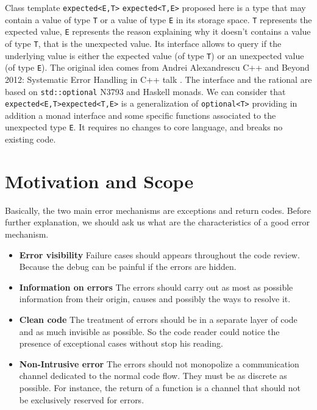 \documentclass[a4paper,10pt]{article}
\newcommand{\cpp}[1]{\lstinline{#1}}
\newcommand{\suppress}[1]{\colorbox{suppress_color}{#1}}
\newcommand{\update}[1]{\colorbox{update_color}{#1}}
\begin{document}
Class template \suppress{\cpp{expected<E,T>}} \update{\cpp{expected<T,E>}} proposed here is a type that may contain a value of type \cpp{T} or a value of type \cpp{E} in its storage space. \cpp{T} represents the expected value, \cpp{E} represents the reason explaining why it doesn't contains a value of type \cpp{T}, that is the unexpected value. Its interface allows to query if the underlying value is either the expected value (of type \cpp{T}) or an unexpected value (of type \cpp{E}). The original idea comes from Andrei Alexandrescu C++ and Beyond 2012: Systematic Error Handling in C++ talk \cite{AlexandrescuExpected}. The interface and the rational are based on \cpp{std::optional} N3793 \cite{OptionalRev5} and Haskell monads. We can consider that \suppress{\cpp{expected<E,T>}}\update{\cpp{expected<T,E>}} is a generalization of \cpp{optional<T>} providing in addition a monad interface and some specific functions associated to the unexpected type \cpp{E}. It requires no changes to core language, and breaks no existing code.

\section{Motivation and Scope}
\label{motiv-scope}

Basically, the two main error mechanisms are exceptions and return codes. Before further explanation, we should ask us what are the characteristics of a good error mechanism.

\begin{itemize}
 \item \textbf{Error visibility} Failure cases should appears throughout the code review. Because the debug can be painful if the errors are hidden.
 \item \textbf{Information on errors} The errors should carry out as most as possible information from their origin, causes and possibly the ways to resolve it.
 \item \textbf{Clean code} The treatment of errors should be in a separate layer of code and as much invisible as possible. So the code reader could notice the presence of exceptional cases without stop his reading.
 \item \textbf{Non-Intrusive error} The errors should not monopolize a communication channel dedicated to the normal code flow. They must be as discrete as possible. For instance, the return of a function is a channel that should not be exclusively reserved for errors.
\end{itemize}
\end{document}
